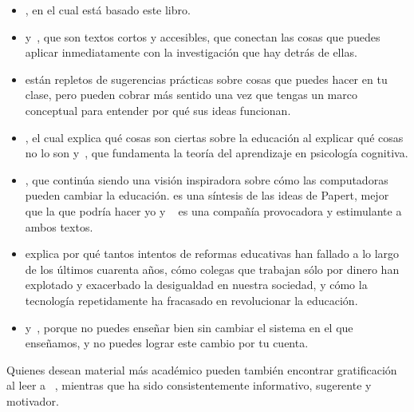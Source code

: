 \begin{itemize}

\item
 ,
 en el cual está basado este libro. 
\item
 \cite{Lang2016} y~\cite{Hust2012}, que son textos cortos y accesibles, que conectan las cosas que puedes aplicar inmediatamente con la investigación que hay detrás de ellas. 

\item
 \cite{Berg2012,Lemo2014,Majo2015,Broo2016,Rice2018,Wein2018b}
 están repletos de sugerencias prácticas sobre cosas que puedes hacer en tu clase,
pero pueden cobrar más sentido una vez que tengas un marco conceptual para entender por qué sus ideas funcionan. 

\item
 \cite{DeBr2015},
 el cual explica qué cosas son ciertas sobre la educación al explicar qué cosas no lo son y~\cite{Dida2016},
 que fundamenta la teoría del aprendizaje en psicología cognitiva. 

\item
 \cite{Pape1993},
 que continúa siendo una visión inspiradora sobre cómo las computadoras pueden cambiar la educación.
 es una síntesis de las ideas de Papert, mejor que la que podría hacer yo y ~\cite{Craw2010} es una compañía provocadora y estimulante a ambos textos.

\item
 \cite{Gree2014,McMi2017,Watt2014} explica por qué tantos intentos de reformas educativas han fallado a lo largo de los últimos cuarenta años, cómo colegas que trabajan sólo por dinero han explotado y exacerbado la desigualdad en nuestra sociedad, y cómo la tecnología repetidamente ha fracasado en revolucionar la educación. 

\item
 \cite{Brow2007} y~\cite{Mann2015},
 porque no puedes enseñar bien sin cambiar el sistema en el que enseñamos,
y no puedes lograr este cambio por tu cuenta.

\end{itemize}

Quienes desean material más académico pueden también encontrar gratificación al leer a ~\cite{Guzd2015a,Hazz2014,Sent2018,Finc2019,Hpl2018},
mientras que  ha sido consistentemente informativo, sugerente y motivador.

